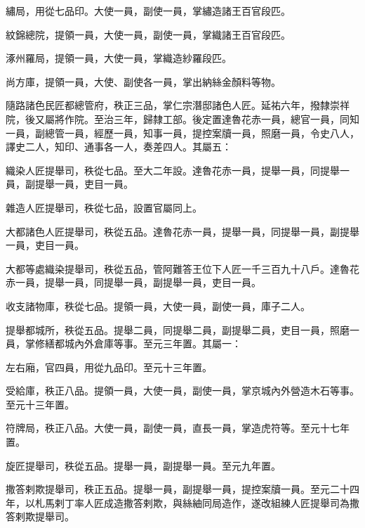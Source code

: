 \begin{pinyinscope}
 繡局，用從七品印。大使一員，副使一員，掌繡造諸王百官段匹。



 紋錦總院，提領一員，大使一員，副使一員，掌織諸王百官段匹。



 涿州羅局，提領一員，大使一員，掌織造紗羅段匹。



 尚方庫，提領一員，大使、副使各一員，掌出納絲金顏料等物。



 隨路諸色民匠都總管府，秩正三品，掌仁宗潛邸諸色人匠。延祐六年，撥隸崇祥院，後又屬將作院。至治三年，歸隸工部。後定置達魯花赤一員，總官一員，同知一員，副總管一員，經歷一員，知事一員，提控案牘一員，照磨一員，令史八人，譯史二人，知印、通事各一人，奏差四人。其屬五：



 織染人匠提舉司，秩從七品。至大二年設。達魯花赤一員，提舉一員，同提舉一員，副提舉一員，吏目一員。



 雜造人匠提舉司，秩從七品，設置官屬同上。



 大都諸色人匠提舉司，秩從五品。達魯花赤一員，提舉一員，同提舉一員，副提舉一員，吏目一員。



 大都等處織染提舉司，秩從五品，管阿難答王位下人匠一千三百九十八戶。達魯花赤一員，提舉一員，同提舉一員，副提舉一員，吏目一員。



 收支諸物庫，秩從七品。提領一員，大使一員，副使一員，庫子二人。



 提舉都城所，秩從五品。提舉二員，同提舉二員，副提舉二員，吏目一員，照磨一員，掌修繕都城內外倉庫等事。至元三年置。其屬一：



 左右廂，官四員，用從九品印。至元十三年置。



 受給庫，秩正八品。提領一員，大使一員，副使一員，掌京城內外營造木石等事。至元十三年置。



 符牌局，秩正八品。大使一員，副使一員，直長一員，掌造虎符等。至元十七年置。



 旋匠提舉司，秩從五品。提舉一員，副提舉一員。至元九年置。



 撒答剌欺提舉司，秩正五品。提舉一員，副提舉一員，提控案牘一員。至元二十四年，以札馬剌丁率人匠成造撒答剌欺，與絲紬同局造作，遂改組練人匠提舉司為撒答剌欺提舉司。




\end{pinyinscope}

